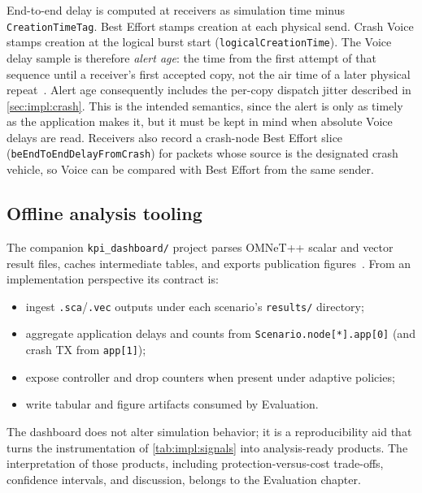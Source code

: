 End-to-end delay is computed at receivers as simulation time minus \texttt{CreationTimeTag}.
Best Effort stamps creation at each physical send.
Crash Voice stamps creation at the logical burst start (\texttt{logicalCreationTime}).
The Voice delay sample is therefore \emph{alert age}: the time from the first attempt of that sequence until a receiver's first accepted copy, not the air time of a later physical repeat~\cite{aguiar2026_veins_qos}.
Alert age consequently includes the per-copy dispatch jitter described in \autoref{sec:impl:crash}.
This is the intended semantics, since the alert is only as timely as the application makes it, but it must be kept in mind when absolute Voice delays are read.
Receivers also record a crash-node Best Effort slice (\texttt{beEndToEndDelayFromCrash}) for packets whose source is the designated crash vehicle, so Voice can be compared with Best Effort from the same sender.

\subsection{Offline analysis tooling}
\label{sec:impl:kpi}

The companion \texttt{kpi\_dashboard/} project parses OMNeT++ scalar and vector result files, caches intermediate tables, and exports publication figures~\cite{aguiar2026_veins_qos}.
From an implementation perspective its contract is:

\begin{itemize}
  \item ingest \texttt{.sca}/\texttt{.vec} outputs under each scenario's \texttt{results/} directory;
  \item aggregate application delays and counts from \texttt{Scenario.node[*].app[0]} (and crash TX from \texttt{app[1]});
  \item expose controller and drop counters when present under adaptive policies;
  \item write tabular and figure artifacts consumed by Evaluation.
\end{itemize}

The dashboard does not alter simulation behavior; it is a reproducibility aid that turns the instrumentation of \autoref{tab:impl:signals} into analysis-ready products.
The interpretation of those products, including protection-versus-cost trade-offs, confidence intervals, and discussion, belongs to the Evaluation chapter.

